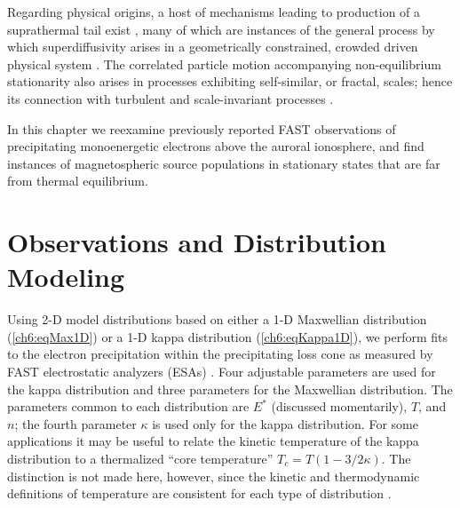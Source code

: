  Regarding physical origins, a host of mechanisms leading to
 production of a suprathermal tail exist \citep[e.g., review
 by][]{Pierrard2010}, many of which are instances of the general
 process by which superdiffusivity arises in a geometrically
 constrained, crowded driven physical system \citep{Benichou2013}.
 The correlated particle motion accompanying non-equilibrium
 stationarity also arises in processes exhibiting self-similar, or
 fractal, scales; hence its connection with turbulent and
 scale-invariant processes \citep{West1990,Treumann1999a,Leubner2004}.

 In this chapter we reexamine previously reported FAST observations of
 precipitating monoenergetic electrons above the auroral ionosphere,
 and find instances of magnetospheric source populations in stationary
 states that are far from thermal equilibrium.

  \section{Observations and Distribution Modeling}

  Using 2-D model distributions based on either a 1-D Maxwellian
  distribution (\ref{ch6:eqMax1D}) or a 1-D kappa distribution
  (\ref{ch6:eqKappa1D}), we perform fits to the electron
  precipitation within the precipitating loss cone as measured by FAST
  electrostatic analyzers (ESAs) \citep{Carlson2001}. Four adjustable
  parameters are used for the kappa distribution and three parameters
  for the Maxwellian distribution. The parameters common to each
  distribution are $E^*$ (discussed momentarily), $T$, and $n$; the
  fourth parameter $\kappa$ is used only for the kappa
  distribution. For some applications \citep[e.g.,][]{Sutherland2012}
  it may be useful to relate the kinetic temperature of the kappa
  distribution to a thermalized ``core temperature'' $T_c = T (1-3/2
  \kappa)$. The distinction is not made here, however, since the
  kinetic and thermodynamic definitions of temperature are consistent
  for each type of distribution \citep{Livadiotis2010}.

